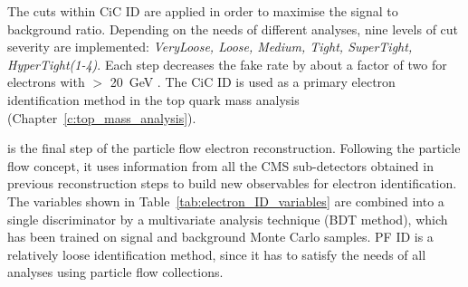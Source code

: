 \begin{description}[wide=\parindent]



The cuts within CiC ID are applied in order to maximise the signal to background ratio. Depending on the needs of
different analyses, nine levels of cut severity are implemented: \textit{VeryLoose, Loose, Medium, Tight, SuperTight,
HyperTight(1-4)}. Each step decreases the fake rate by about a factor of two for electrons with \ET$>$ \SI{20}{\GeV}
\autocite{CiC_ID}. The CiC ID is used as a primary electron identification method in the top quark mass analysis
(Chapter~\ref{c:top_mass_analysis}).

 \item[Particle flow ID] \autocite{PF} is the final step of the particle flow electron reconstruction. Following the
particle flow concept, it uses information from all the CMS sub-detectors obtained in previous reconstruction steps to
build new observables for electron identification. The variables shown in Table~\ref{tab:electron_ID_variables} are
combined into a single discriminator by a multivariate analysis technique (BDT method), which has been trained on signal
and background Monte Carlo samples. PF ID is a relatively loose identification method, since it has to satisfy the needs
of all analyses using particle flow collections.


\end{description}

